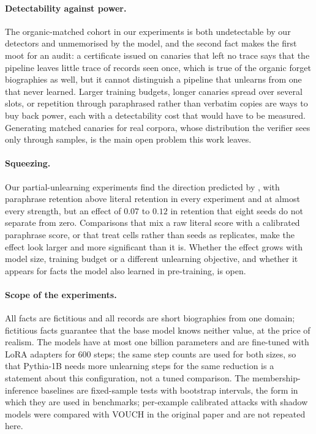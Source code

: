 \paragraph{Detectability against power.} The organic-matched cohort in our experiments is
both undetectable by our detectors and unmemorised by the model, and the second fact makes
the first moot for an audit: a certificate issued on canaries that left no trace says that
the pipeline leaves little trace of records seen once, which is true of the organic forget
biographies as well, but it cannot distinguish a pipeline that unlearns from one that
never learned. Larger training budgets, longer canaries spread over several slots, or
repetition through paraphrased rather than verbatim copies are ways to buy back power, each
with a detectability cost that would have to be measured. Generating matched canaries for
real corpora, whose distribution the verifier sees only through samples, is the main open
problem this work leaves.

\paragraph{Squeezing.} Our partial-unlearning experiments find the direction predicted by
\citet{li2026beliefs}, with paraphrase retention above literal retention in every
experiment and at almost every strength, but an effect of $0.07$ to $0.12$ in retention
that eight seeds do not separate from zero. Comparisons that mix a raw literal score with a calibrated paraphrase
score, or that treat cells rather than seeds as replicates, make the effect look larger and
more significant than it is. Whether the effect grows with model size, training budget or a different
unlearning objective, and whether it appears for facts the model also learned in
pre-training, is open.

\paragraph{Scope of the experiments.} All facts are fictitious and all records are short
biographies from one domain; fictitious facts guarantee that the base model knows neither
value, at the price of realism. The models have at most one billion parameters and are
fine-tuned with LoRA adapters for $600$ steps; the same step counts are used for both
sizes, so that Pythia-1B needs more unlearning steps for the same reduction is a statement
about this configuration, not a tuned comparison. The membership-inference baselines are
fixed-sample tests with bootstrap intervals, the form in which they are used in
benchmarks; per-example calibrated attacks with shadow models \citep{carlini2022lira,
hayes2024inexact} were compared with VOUCH in the original paper and are not repeated
here.


